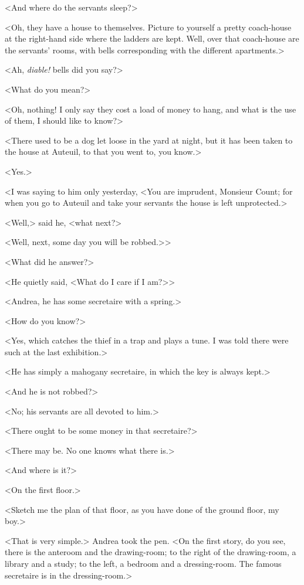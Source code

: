  <And where do the servants sleep?> 

 <Oh, they have a house to themselves. Picture to yourself a pretty coach-house at the right-hand side where the ladders are kept. Well, over that coach-house are the servants' rooms, with bells corresponding with the different apartments.> 

 <Ah, \textit{diable!} bells did you say?> 

 <What do you mean?> 

 <Oh, nothing! I only say they cost a load of money to hang, and what is the use of them, I should like to know?> 

 <There used to be a dog let loose in the yard at night, but it has been taken to the house at Auteuil, to that you went to, you know.> 

 <Yes.> 

 <I was saying to him only yesterday, <You are imprudent, Monsieur Count; for when you go to Auteuil and take your servants the house is left unprotected.>

<Well,> said he, <what next?>

<Well, next, some day you will be robbed.>> 

 <What did he answer?> 

 <He quietly said, <What do I care if I am?>> 

 <Andrea, he has some secretaire with a spring.> 

 <How do you know?> 

 <Yes, which catches the thief in a trap and plays a tune. I was told there were such at the last exhibition.> 

 <He has simply a mahogany secretaire, in which the key is always kept.> 

 <And he is not robbed?> 

 <No; his servants are all devoted to him.> 

 <There ought to be some money in that secretaire?> 

 <There may be. No one knows what there is.> 

 <And where is it?> 

 <On the first floor.> 

 <Sketch me the plan of that floor, as you have done of the ground floor, my boy.> 

 <That is very simple.> Andrea took the pen. <On the first story, do you see, there is the anteroom and the drawing-room; to the right of the drawing-room, a library and a study; to the left, a bedroom and a dressing-room. The famous secretaire is in the dressing-room.> 

